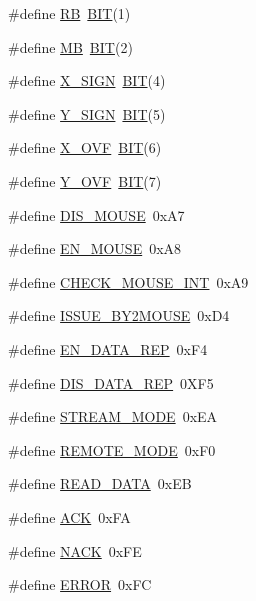 \begin{DoxyCompactItemize}
\item 
\#define \mbox{\hyperlink{group__i8042_ga171160a766f85c8816b898ed24d28408}{RB}}~\mbox{\hyperlink{group__vbe_ga3a8ea58898cb58fc96013383d39f482c}{B\+IT}}(1)
\item 
\#define \mbox{\hyperlink{group__i8042_gaa6b38d492364d98453284934ed7caee9}{MB}}~\mbox{\hyperlink{group__vbe_ga3a8ea58898cb58fc96013383d39f482c}{B\+IT}}(2)
\item 
\#define \mbox{\hyperlink{group__i8042_ga181f1c2860e4d7fd7788990378061137}{X\+\_\+\+S\+I\+GN}}~\mbox{\hyperlink{group__vbe_ga3a8ea58898cb58fc96013383d39f482c}{B\+IT}}(4)
\item 
\#define \mbox{\hyperlink{group__i8042_ga2a0064e2f0979eea21b81e4fe6b2ac32}{Y\+\_\+\+S\+I\+GN}}~\mbox{\hyperlink{group__vbe_ga3a8ea58898cb58fc96013383d39f482c}{B\+IT}}(5)
\item 
\#define \mbox{\hyperlink{group__i8042_ga858379c2252a71bc12dd9ff796477d90}{X\+\_\+\+O\+VF}}~\mbox{\hyperlink{group__vbe_ga3a8ea58898cb58fc96013383d39f482c}{B\+IT}}(6)
\item 
\#define \mbox{\hyperlink{group__i8042_ga8238446128710bc20d7c73b2fa785c72}{Y\+\_\+\+O\+VF}}~\mbox{\hyperlink{group__vbe_ga3a8ea58898cb58fc96013383d39f482c}{B\+IT}}(7)
\item 
\#define \mbox{\hyperlink{group__i8042_gaec49e28277af866462cbe6e426a120ef}{D\+I\+S\+\_\+\+M\+O\+U\+SE}}~0x\+A7
\item 
\#define \mbox{\hyperlink{group__i8042_gaf9776e4566c3a77a7c3631530998f386}{E\+N\+\_\+\+M\+O\+U\+SE}}~0x\+A8
\item 
\#define \mbox{\hyperlink{group__i8042_gae3d0f97115be6f01d0ad43399f709868}{C\+H\+E\+C\+K\+\_\+\+M\+O\+U\+S\+E\+\_\+\+I\+NT}}~0x\+A9
\item 
\#define \mbox{\hyperlink{group__i8042_gaa0b21fb358640f27c94090e845b497ae}{I\+S\+S\+U\+E\+\_\+\+B\+Y2\+M\+O\+U\+SE}}~0x\+D4
\item 
\#define \mbox{\hyperlink{group__i8042_ga9316ae006907490c32654ca0248e678a}{E\+N\+\_\+\+D\+A\+T\+A\+\_\+\+R\+EP}}~0x\+F4
\item 
\#define \mbox{\hyperlink{group__i8042_ga1c84607e844d7b3736a1a3491c18e872}{D\+I\+S\+\_\+\+D\+A\+T\+A\+\_\+\+R\+EP}}~0\+X\+F5
\item 
\#define \mbox{\hyperlink{group__i8042_gab3919f33b46e0808c4ed1c56a6a423f2}{S\+T\+R\+E\+A\+M\+\_\+\+M\+O\+DE}}~0x\+EA
\item 
\#define \mbox{\hyperlink{group__i8042_ga17981ca5836957abd2dfe6b77d96744d}{R\+E\+M\+O\+T\+E\+\_\+\+M\+O\+DE}}~0x\+F0
\item 
\#define \mbox{\hyperlink{group__i8042_ga8d406d5aff787991429e62cfd9bac721}{R\+E\+A\+D\+\_\+\+D\+A\+TA}}~0x\+EB
\item 
\#define \mbox{\hyperlink{group__i8042_ga6f6489887e08bff4887d0bc5dcf214d8}{A\+CK}}~0x\+FA
\item 
\#define \mbox{\hyperlink{group__i8042_ga958518a45b12053ae33606ee7cb68a55}{N\+A\+CK}}~0x\+FE
\item 
\#define \mbox{\hyperlink{group__i8042_ga8fe83ac76edc595f6b98cd4a4127aed5}{E\+R\+R\+OR}}~0x\+FC
\end{DoxyCompactItemize}


